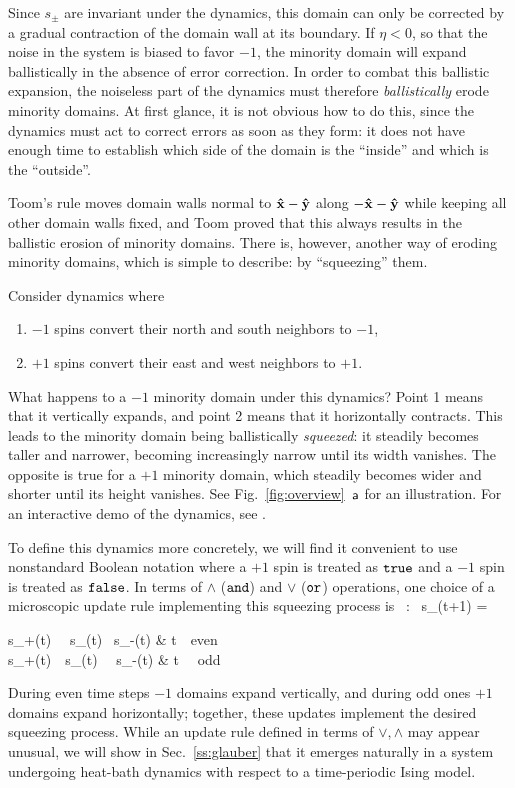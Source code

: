 \documentclass[pra,aps,twocolumn,groupedaddress,superscriptaddress,nofootinbib,preprintnumbers]{revtex4-2}
\begin{document}
	
	Since $s_\pm$ are invariant under the dynamics, this domain can only be corrected by a gradual contraction of the domain wall at its boundary. 
	If $\eta<0$, so that the noise in the system is biased to favor $-1$, the minority domain will expand ballistically in the absence of error correction. In order to combat this ballistic expansion, the noiseless part of the dynamics must therefore {\it ballistically} erode minority domains. At first glance, it is not obvious how to do this, since the dynamics must act to correct errors as soon as they form: it does not have enough time to establish which side of the domain is the ``inside'' and which is the ``outside''. 
	
	Toom's rule moves domain walls normal to $\uvx-\uvy$ along $-\uvx-\uvy$ while keeping all other domain walls fixed, and Toom proved that this always results in the ballistic erosion of minority domains. There is, however, another way of eroding minority domains, which is simple to describe: by ``squeezing'' them. 
	
	Consider dynamics where 
	\begin{enumerate}
		\item $-1$ spins convert their north and south neighbors to $-1$,
		\item $+1$ spins convert their east and west neighbors to $+1$.
	\end{enumerate}
	What happens to a $-1$ minority domain under this dynamics? Point 1 means that it vertically expands, and point 2 means that it horizontally contracts. This leads to the minority domain being ballistically {\it squeezed}: it steadily becomes taller and narrower, becoming increasingly narrow until its width vanishes. The opposite is true for a $+1$ minority domain, which steadily becomes wider and shorter until its height vanishes. See Fig.~\ref{fig:overview}~$\sfa$ for an illustration. For an interactive demo of the dynamics, see \cite{supp}. 
	
	To define this dynamics more concretely, we will find it convenient to use nonstandard Boolean notation where a $+1$ spin is treated as $\tt{true}$ and a $-1$ spin is treated as $\tt{false}$. In terms of $\wedge$ ($\tt{and}$) and $\vee$ ($\tt{or}$) operations, one choice of a microscopic update rule implementing this squeezing process is 
	\bea \label{sqzrule_r} \sfR\, : \, s_\bfr(t+1) = \begin{dcases} s_{\bfr+\uvy}(t) \, \wedge \, s_{\bfr}(t) \wedge\, s_{\bfr-\uvy}(t)  & t \,\, {\rm even}  \\ 
		s_{\bfr+\uvx}(t)\, \vee \, s_\bfr(t) \, \vee \,  s_{\bfr-\uvx}(t) & t \, \, {\rm odd} 
	\end{dcases} \eea
	During even time steps $-1$ domains expand vertically, and during odd ones $+1$ domains expand horizontally; together, these updates implement the desired squeezing process. 
	While an update rule defined in terms of $\vee,\wedge$ may appear unusual, we will show in Sec.~\ref{ss:glauber} that it emerges naturally in a system undergoing heat-bath dynamics with respect to a time-periodic Ising model. 
	
\end{document}
